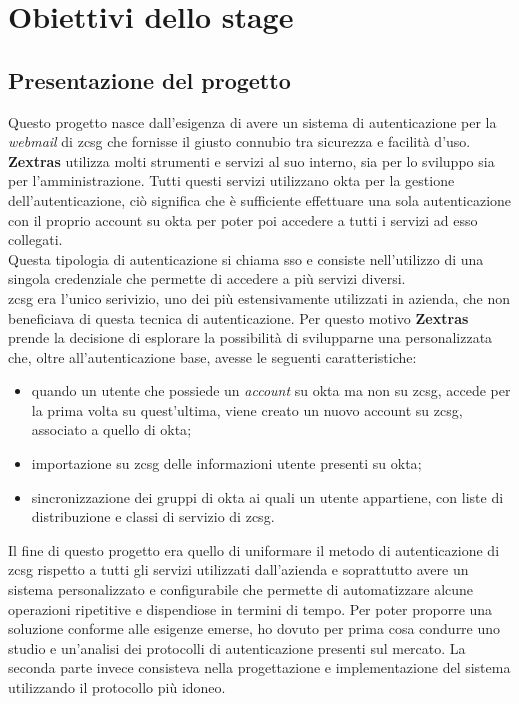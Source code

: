 
\chapter{Obiettivi dello stage}
\label{cap:obiettivi}


\section{Presentazione del progetto}
    Questo progetto nasce dall'esigenza di avere un sistema di autenticazione per la \textit{webmail} di \gls{zcsg} che fornisse il giusto connubio tra sicurezza e facilità d'uso. \textbf{Zextras} utilizza molti strumenti e servizi al suo interno, sia per lo sviluppo sia per l'amministrazione. Tutti questi servizi utilizzano \gls{okta} per la gestione dell'autenticazione, ciò significa che è sufficiente effettuare una sola autenticazione con il proprio account su \gls{okta} per poter poi accedere a tutti i servizi ad esso collegati. \\
    Questa tipologia di autenticazione si chiama \gls{sso} e consiste nell'utilizzo di una singola credenziale che permette di accedere a più servizi diversi. \\
    \gls{zcsg} era l'unico serivizio, uno dei più estensivamente utilizzati in azienda, che non beneficiava di questa tecnica di autenticazione. Per questo motivo \textbf{Zextras} prende la decisione di esplorare la possibilità di svilupparne una personalizzata che, oltre all'autenticazione base, avesse le seguenti caratteristiche:
    \begin{itemize}
        \item quando un utente che possiede un \textit{account} su \gls{okta} ma non su \gls{zcsg}, accede per la prima volta su quest'ultima, viene creato un nuovo account su \gls{zcsg}, associato a quello di \gls{okta};
        \item importazione su \gls{zcsg} delle informazioni utente presenti su \gls{okta};
        \item sincronizzazione dei gruppi di \gls{okta} ai quali un utente appartiene, con liste di distribuzione e classi di servizio di \gls{zcsg}.
    \end{itemize}
    Il fine di questo progetto era quello di uniformare il metodo di autenticazione di \gls{zcsg} rispetto a tutti gli servizi utilizzati dall'azienda e soprattutto avere un sistema personalizzato e configurabile che permette di automatizzare alcune operazioni ripetitive e dispendiose in termini di tempo.
    Per poter proporre una soluzione conforme alle esigenze emerse, ho dovuto per prima cosa condurre uno studio e un'analisi dei protocolli di autenticazione presenti sul mercato. La seconda parte invece consisteva nella progettazione e implementazione del sistema utilizzando il protocollo più idoneo.
    
